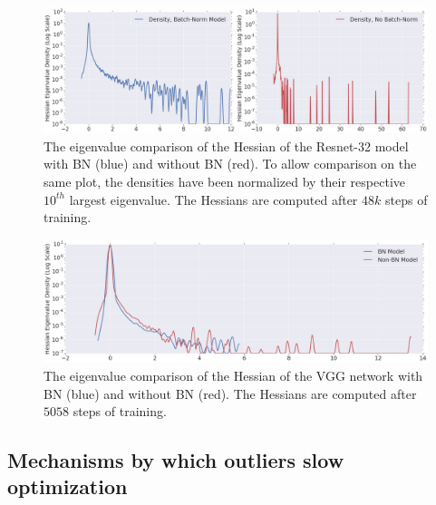 \documentclass{article}
\begin{document}
\begin{figure}[ht]
\includegraphics[width=\textwidth]{ResNet_7000.png}
\vspace{-0.5cm}
\caption{The eigenvalue comparison of the Hessian of the Resnet-32 model with BN (blue) and without BN (red). To allow comparison on the same plot, the densities have been normalized by their respective $10^{th}$ largest eigenvalue. The Hessians are computed after $48k$ steps of training. \label{fig:comparison_bn_Resnet}}
\end{figure}

\begin{figure}[ht]
\includegraphics[width=\textwidth]{VGG_5000.png}
\vspace{-0.5cm}
\caption{The eigenvalue comparison of the Hessian of the VGG network with BN (blue) and without BN (red). The Hessians are computed after $5058$ steps of training. \label{fig:comparison_bn_vgg}}
\end{figure}

\subsection{Mechanisms by which outliers slow optimization}
\label{sec:outliers}
\end{document}
